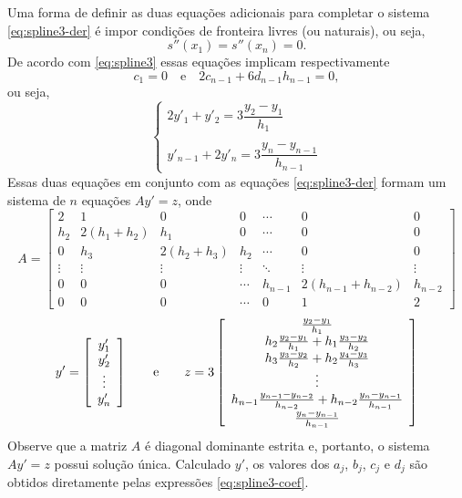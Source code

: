Uma forma de definir as duas equações adicionais para completar o sistema \eqref{eq:spline3-der} é impor condições de fronteira livres (ou naturais), ou seja,
\begin{equation}
s''(x_1)=s''(x_n)=0.
\end{equation}
De acordo com \eqref{eq:spline3} essas equações implicam respectivamente
\begin{equation*}
c_1=0\quad\text{e}\quad 2c_{n-1}+6d_{n-1}h_{n-1}=0,
\end{equation*}
ou seja, 
\begin{equation}
\left\{\begin{array}{l}
2y'_1+y'_2=3\dfrac{y_2-y_1}{h_1}\\
\\
y'_{n-1}+2y'_n=3\dfrac{y_n-y_{n-1}}{h_{n-1}}
\end{array}\right.
\end{equation}
Essas duas equações em conjunto com as equações \eqref{eq:spline3-der} formam um sistema de $n$ equações $Ay'=z$, onde
\begin{equation}
A=\left[\begin{array}{ccccccc}
2 &1&0&0 &\cdots&0&0\\
h_2&2(h_1+h_2)&h_1&0&\cdots&0&0\\
0&h_3&2(h_2+h_3)&h_2&\cdots&0&0\\
\vdots&\vdots&\vdots&\vdots&\ddots&\vdots&\vdots\\
0&0&0&\cdots&h_{n-1} & 2(h_{n-1}+h_{n-2})&h_{n-2}\\
0&0&0&\cdots &0&1&2
\end{array}\right]  
\end{equation}
\begin{equation}
y' = \left[\begin{array}{c}
y'_1\\
y'_2\\
\vdots\\
y'_n
\end{array}\right]\qquad \hbox{e}\qquad
z = 3\left[\begin{array}{c}
\frac{y_2-y_1}{h_1}\\
h_2\frac{y_2-y_1}{h_1}+h_1\frac{y_3-y_2}{h_2}\\
h_3\frac{y_3-y_2}{h_2}+h_2\frac{y_4-y_3}{h_3}\\
\vdots\\
h_{n-1}\frac{y_{n-1}-y_{n-2}}{h_{n-2}}+h_{n-2}\frac{y_n-y_{n-1}}{h_{n-1}}\\
\frac{y_n-y_{n-1}}{h_{n-1}}
\end{array}\right]
\end{equation}
Observe que a matriz $A$ é diagonal dominante estrita e, portanto, o sistema $Ay'=z$ possui solução única. Calculado $y'$, os valores dos $a_j$, $b_j$, $c_j$ e $d_j$ são obtidos diretamente pelas expressões \eqref{eq:spline3-coef}.

